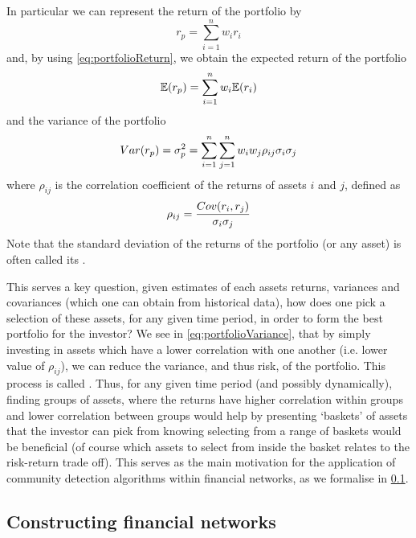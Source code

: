 In particular we can represent the return of the portfolio by
\begin{equation}
	\label{eq:portfolioReturn}
	r_{p} = \sum_{i=1}^{n} w_{i} r_{i}
\end{equation}
and, by using \cref{eq:portfolioReturn}, we obtain the expected return of the portfolio
\begin{equation}
	\label{eq:portfolioExpectedReturn}
	\mathbb{E}(r_{p}) = \sum_{i=1}^{n} w_{i} \mathbb{E}(r_{i})
\end{equation}
and the variance of the portfolio
\begin{equation}
	\label{eq:portfolioVariance}
	Var(r_{p}) = \sigma^{2}_{p}  = \sum_{i=1}^{n} \sum_{j=1}^{n} w_{i} w_{j} \rho_{ij} \sigma_{i} \sigma_{j}
\end{equation}
where $\rho_{ij}$ is the correlation coefficient of the returns of assets $i$ and $j$, defined as
\begin{equation}
	\label{eq:correlationCoefficient}
	\rho_{ij} = \frac{\covariance{r_{i},r_{j}}}{\sigma_{i} \sigma_{j}}
\end{equation}
Note that the standard deviation of the returns of the portfolio (or any asset) is often called its .

This serves a key question, given estimates of each assets returns, variances and covariances (which one can obtain from historical data), how does one pick a selection of these assets, for any given time period, in order to form the best portfolio for the investor?
We see in \cref{eq:portfolioVariance}, that by simply investing in assets which have a lower correlation with one another (i.e. lower value of $\rho_{ij}$), we can reduce the variance, and thus risk, of the portfolio. This process is called .
Thus, for any given time period (and possibly dynamically), finding groups of assets, where the returns have higher correlation within groups and lower correlation between groups would help by presenting `baskets' of assets that the investor can pick from knowing selecting from a range of baskets would be beneficial (of course which assets to select from inside the basket relates to the risk-return trade off). This serves as the main motivation for the application of community detection algorithms within financial networks, as we formalise in \cref{subsec:financialNetworksConstructionBackground}.


\subsection{Constructing financial networks}
\label{subsec:financialNetworksConstructionBackground}

